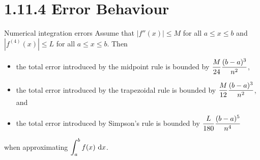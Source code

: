 \section{1.11.4 Error Behaviour}
\begin{frame}[t]
\begin{block}{Numerical integration errors}
Assume that $|f''(x)|\le M$ for all $a \le x \le b$ and $|f^{(4)}(x)|\le L$ for all $a \le x \le b$. Then
\begin{itemize}
\item the total error introduced by the midpoint rule is bounded by $\displaystyle\frac{M}{24}\frac{(b-a)^3}{n^2}$, 
\item the total error introduced by the trapezoidal rule is bounded by $\displaystyle\frac{M}{12}\frac{(b-a)^3}{n^2}$, and 
\item the total error introduced by Simpson's rule is bounded by $\displaystyle\frac{L}{180}\frac{(b-a)^5}{n^4}$ 
\end{itemize}
when approximating $\displaystyle\int_a^b f(x)\ \text{d} x$.
\end{block}
\end{frame}

